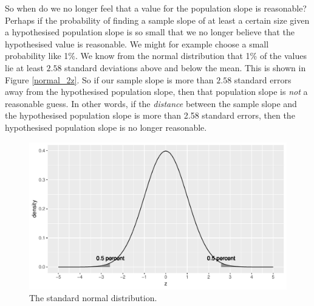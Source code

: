 \documentclass[]{report}\usepackage[]{graphicx}\usepackage[]{color}
\makeatletter
\def\maxwidth{ %
  \ifdim\Gin@nat@width>\linewidth
    \linewidth
  \else
    \Gin@nat@width
  \fi
}
\newenvironment{knitrout}{}{} %
\makeatother
\begin{document}
So when do we no longer feel that a value for the population slope is reasonable? Perhaps if the probability of finding a sample slope of at least a certain size given a hypothesised population slope is so small that we no longer believe that the hypothesised value is reasonable. We might for example choose a small probability like 1\%. We know from the normal distribution that 1\% of the values lie at least $2.58$ standard deviations above and below the mean. This is shown in Figure \ref{normal_2z}. So if our sample slope is more than $2.58$ standard errors away from the hypothesised population slope, then that population slope is \textit{not} a reasonable guess. In other words, if the \textit{distance} between the sample slope and the hypothesised population slope is more than 2.58 standard errors, then the hypothesised population slope is no longer reasonable.

\begin{knitrout}
\color{fgcolor}\begin{figure}

{\centering \includegraphics[width=\maxwidth]{figure/normal_2z-1} 

}

\caption[The standard normal distribution]{The standard normal distribution.}\label{fig:normal_2z}
\end{figure}


\end{knitrout}
\end{document}
